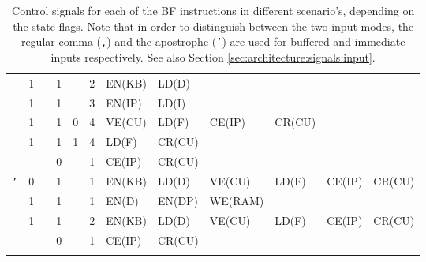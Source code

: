 \begin{landscape}
\begin{longtable}[c] {c|cccc|c|llllll}
    \rowcolor{White}             & 1 &   & 1     &      & 2     & EN(KB)  & LD(D)   &        &        &        &        \\
    \rowcolor{White}             & 1 &   & 1     &      & 3     & EN(IP)  & LD(I)   &        &        &        &        \\
    \rowcolor{White}             & 1 &   & 1     & 0    & 4     & VE(CU)  & LD(F)   & CE(IP) & CR(CU) &        &        \\
    \rowcolor{Gray}              & 1 &   & 1     & 1    & 4     & LD(F)   & CR(CU)  &        &        &        &        \\
    \rowcolor{White}             &   &   & 0     &      & 1     & CE(IP) & CR(CU)  &         &        &        &        \\ \hline
    \rowcolor{Gray}  \texttt{'}  & 0 &   & 1     &      & 1     & EN(KB)  & LD(D)   & VE(CU) & LD(F)  & CE(IP) & CR(CU) \\
    \rowcolor{White}             & 1 &   & 1     &      & 1     & EN(D)   & EN(DP)  & WE(RAM)&        &        &        \\
    \rowcolor{White}             & 1 &   & 1     &      & 2     & EN(KB)  & LD(D)   & VE(CU) & LD(F)  & CE(IP) & CR(CU) \\
    \rowcolor{Gray}              &   &   & 0     &      & 1     & CE(IP) & CR(CU)  &         &        &        &        \\ \hline
    

    \caption{Control signals for each of the BF instructions in different scenario's, depending on the state flags. Note that in order to distinguish between the two input modes, the regular comma (\texttt{,}) and the apostrophe (\texttt{'}) are used for buffered and immediate inputs respectively. See also Section \ref{sec:architecture:signals:input}.}
    \label{tab:microcode}
  \end{longtable}
\end{landscape}
